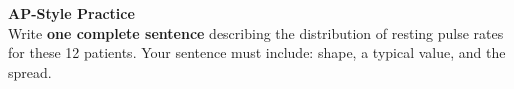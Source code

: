 \documentclass[10pt]{article}
\begin{document}
\vspace{0.18in}

\begin{tcolorbox}[colback=redbg, colframe=redacc, boxrule=0.8pt, arc=2mm,
    left=4mm, right=4mm, top=3mm, bottom=3mm]
\small\textbf{AP-Style Practice}\\[6pt]
Write \textbf{one complete sentence} describing the distribution of resting pulse
rates for these 12 patients. Your sentence must include: shape, a typical value,
and the spread.\\[10pt]
\writeline\\[1pt]\writeline\\[1pt]\writeline
\end{tcolorbox}
\end{document}
